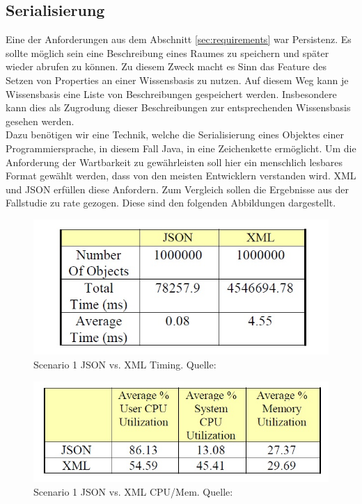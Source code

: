 \documentclass[a4paper]{article}
\begin{document}
	\subsection{Serialisierung}
	\label{sec:konz_serialisierung}
	
	Eine der Anforderungen aus dem Abschnitt \ref{sec:requirements} war Persistenz.
	Es sollte möglich sein eine Beschreibung eines Raumes zu speichern und später
	wieder abrufen zu können. Zu diesem Zweck macht es Sinn das Feature des Setzen
	von Properties an einer Wissensbasis zu nutzen. Auf diesem Weg kann je 
	Wissensbasis eine Liste von Beschreibungen gespeichert werden. Insbesondere
	kann dies als Zugrodung dieser Beschreibungen zur entsprechenden Wissensbasis
	gesehen werden. \\
	
	Dazu benötigen wir eine Technik, welche die Serialisierung eines Objektes einer
	Programmiersprache, in diesem Fall Java, in eine Zeichenkette ermöglicht. Um
	die Anforderung der Wartbarkeit zu gewährleisten soll hier ein menschlich
	lesbares Format gewählt werden, dass von den meisten Entwicklern verstanden
	wird. XML und JSON erfüllen diese Anfordern. Zum Vergleich sollen die
	Ergebnisse aus der Fallstudie \cite{XmlJson} zu rate gezogen. Diese sind den
	folgenden Abbildungen dargestellt.
	
	\begin{figure}[H] 
		\includegraphics[width=\linewidth]{../Bilder/xml_json_time_sen1.jpg}
		\caption{Scenario 1 JSON vs. XML Timing. Quelle: \cite{XmlJson}}
		\label{fig:xml_json_time_sen1}
	\end{figure}
	
	\begin{figure}[H] 
		\includegraphics[width=\linewidth]{../Bilder/xml_json_mem_sen1.jpg}
		\caption{Scenario 1 JSON vs. XML CPU/Mem. Quelle: \cite{XmlJson}}
		\label{fig:xml_json_mem_sen1}
	\end{figure}
	
\end{document}

